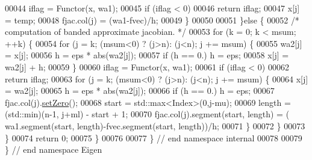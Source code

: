 \begin{DoxyCode}
00044             iflag = Functor(x, wa1);
00045             \textcolor{keywordflow}{if} (iflag < 0)
00046                 \textcolor{keywordflow}{return} iflag;
00047             x[j] = temp;
00048             fjac.col(j) = (wa1-fvec)/h;
00049         \}
00050 
00051     \}\textcolor{keywordflow}{else} \{
00052         \textcolor{comment}{/* computation of banded approximate jacobian. */}
00053         \textcolor{keywordflow}{for} (k = 0; k < msum; ++k) \{
00054             \textcolor{keywordflow}{for} (j = k; (msum<0) ? (j>n): (j<n); j += msum) \{
00055                 wa2[j] = x[j];
00056                 h = eps * abs(wa2[j]);
00057                 \textcolor{keywordflow}{if} (h == 0.) h = eps;
00058                 x[j] = wa2[j] + h;
00059             \}
00060             iflag = Functor(x, wa1);
00061             \textcolor{keywordflow}{if} (iflag < 0)
00062                 \textcolor{keywordflow}{return} iflag;
00063             \textcolor{keywordflow}{for} (j = k; (msum<0) ? (j>n): (j<n); j += msum) \{
00064                 x[j] = wa2[j];
00065                 h = eps * abs(wa2[j]);
00066                 \textcolor{keywordflow}{if} (h == 0.) h = eps;
00067                 fjac.col(j).\hyperlink{class_eigen_1_1_plain_object_base_ac21ad5f989f320e46958b75ac8d9a1da}{setZero}();
00068                 start = std::max<Index>(0,j-mu);
00069                 length = (std::min)(n-1, j+ml) - start + 1;
00070                 fjac.col(j).segment(start, length) = ( wa1.segment(start, length)-fvec.segment(start, 
      length))/h;
00071             \}
00072         \}
00073     \}
00074     \textcolor{keywordflow}{return} 0;
00075 \}
00076 
00077 \} \textcolor{comment}{// end namespace internal}
00078 
00079 \} \textcolor{comment}{// end namespace Eigen}
\end{DoxyCode}
